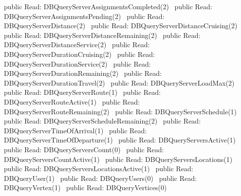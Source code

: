 public \LA{}Read: DBQueryServerAssignmentsCompleted(2)~{\nwtagstyle{}}\RA{}
public \LA{}Read: DBQueryServerAssignmentsPending(2)~{\nwtagstyle{}}\RA{}
public \LA{}Read: DBQueryServerDistance(2)~{\nwtagstyle{}}\RA{}
public \LA{}Read: DBQueryServerDistanceCruising(2)~{\nwtagstyle{}}\RA{}
public \LA{}Read: DBQueryServerDistanceRemaining(2)~{\nwtagstyle{}}\RA{}
public \LA{}Read: DBQueryServerDistanceService(2)~{\nwtagstyle{}}\RA{}
public \LA{}Read: DBQueryServerDurationCruising(2)~{\nwtagstyle{}}\RA{}
public \LA{}Read: DBQueryServerDurationService(2)~{\nwtagstyle{}}\RA{}
public \LA{}Read: DBQueryServerDurationRemaining(2)~{\nwtagstyle{}}\RA{}
public \LA{}Read: DBQueryServerDurationTravel(2)~{\nwtagstyle{}}\RA{}
public \LA{}Read: DBQueryServerLoadMax(2)~{\nwtagstyle{}}\RA{}
public \LA{}Read: DBQueryServerRoute(1)~{\nwtagstyle{}}\RA{}
public \LA{}Read: DBQueryServerRouteActive(1)~{\nwtagstyle{}}\RA{}
public \LA{}Read: DBQueryServerRouteRemaining(2)~{\nwtagstyle{}}\RA{}
public \LA{}Read: DBQueryServerSchedule(1)~{\nwtagstyle{}}\RA{}
public \LA{}Read: DBQueryServerScheduleRemaining(2)~{\nwtagstyle{}}\RA{}
public \LA{}Read: DBQueryServerTimeOfArrival(1)~{\nwtagstyle{}}\RA{}
public \LA{}Read: DBQueryServerTimeOfDeparture(1)~{\nwtagstyle{}}\RA{}
public \LA{}Read: DBQueryServersActive(1)~{\nwtagstyle{}}\RA{}
public \LA{}Read: DBQueryServersCount(0)~{\nwtagstyle{}}\RA{}
public \LA{}Read: DBQueryServersCountActive(1)~{\nwtagstyle{}}\RA{}
public \LA{}Read: DBQueryServersLocations(1)~{\nwtagstyle{}}\RA{}
public \LA{}Read: DBQueryServersLocationsActive(1)~{\nwtagstyle{}}\RA{}
public \LA{}Read: DBQueryUser(1)~{\nwtagstyle{}}\RA{}
public \LA{}Read: DBQueryUsers(0)~{\nwtagstyle{}}\RA{}
public \LA{}Read: DBQueryVertex(1)~{\nwtagstyle{}}\RA{}
public \LA{}Read: DBQueryVertices(0)~{\nwtagstyle{}}\RA{}
